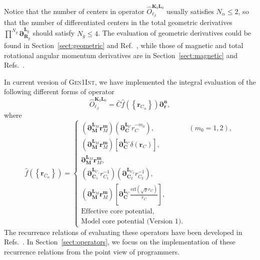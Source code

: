 \documentclass[a4paper,11pt,twoside,openright]{book}
\begin{document}
Notice that the number of centers in operator $\hat{O}_{\ell_{\beta}}^{\boldsymbol{K}_{0}\boldsymbol{L}_{0}}$
usually satisfies $N_{\alpha}\le2$, so that the number of differentiated centers in the total geometric
derivatives $\prod^{N_{g}}\boldsymbol{\partial}_{\boldsymbol{R}_{g}}^{\boldsymbol{L}_{g}}$
should satisfy $N_{g}\le4$. The evaluation of geometric derivatives could be found
in Section~\ref{sect:geometric} and Ref.~\cite{bgkr}, while those of magnetic and total rotational
angular momentum derivatives are in Section~\ref{sect:magnetic} and Refs.~\cite{bgkrth-a,bgkr}.

In current version of \textsc{Gen1Int}, we have implemented the integral evaluation of the following
different forms of operator
\begin{equation}
  \label{eq:operator-form}
  \hat{O}_{\ell_{\beta}}^{\boldsymbol{K}_{0}\boldsymbol{L}_{0}}%
  =\bar{C}\hat{f}\left(\left\{\boldsymbol{r}_{C_{\alpha}}\right\}\right)\boldsymbol{\partial}_{\boldsymbol{r}}^{\boldsymbol{n}},
\end{equation}
where
\begin{equation}
  \hat{f}\left(\left\{\boldsymbol{r}_{C_{\alpha}}\right\}\right)=
  \begin{cases}
    \left(\boldsymbol{\partial}_{\boldsymbol{M}}^{\boldsymbol{L}_{M}}\boldsymbol{r}_{M}^{\boldsymbol{m}}\right)%
      \left(\boldsymbol{\partial}_{\boldsymbol{C}}^{\boldsymbol{L}_{C}}r_{C}^{-m_{0}}\right),&(m_{0}=1,2),\\
    \left(\boldsymbol{\partial}_{\boldsymbol{M}}^{\boldsymbol{L}_{M}}\boldsymbol{r}_{M}^{\boldsymbol{m}}\right)%
      \left[\boldsymbol{\partial}_{\boldsymbol{C}}^{\boldsymbol{L}_{C}}\delta(\boldsymbol{r}_{C})\right],\\
    \boldsymbol{\partial}_{\boldsymbol{M}}^{\boldsymbol{L}_{M}}\boldsymbol{r}_{M}^{\boldsymbol{m}},\\
    \left(\boldsymbol{\partial}_{\boldsymbol{C}_{1}}^{\boldsymbol{L}_{C_{1}}}r_{C_{1}}^{-1}\right)%
      \left(\boldsymbol{\partial}_{\boldsymbol{C}_{2}}^{\boldsymbol{L}_{C_{2}}}r_{C_{2}}^{-1}\right),\\
    \left(\boldsymbol{\partial}_{\boldsymbol{M}}^{\boldsymbol{L}_{M}}\boldsymbol{r}_{M}^{\boldsymbol{m}}\right)%
      \left[\boldsymbol{\partial}_{\boldsymbol{C}}^{\boldsymbol{L}_{C}}\frac{\mathrm{erf}\left(\sqrt{\varrho}r_{C}\right)}{r_{C}}\right],\\
    \text{Effective core potential},\\
    \text{Model core potential (Version 1)}.
  \end{cases}
\end{equation}
The recurrence relations of evaluating these operators have been developed in
Refs.~\cite{Gao:IJQC:2010,bgkrth-a,bgkr}. In Section~\ref{sect:operators}, we focus
on the implementation of these recurrence relations from the point view of programmers.
\end{document}
